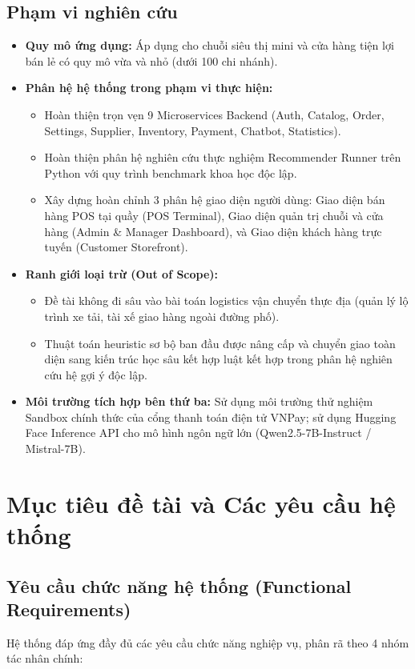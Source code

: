 \documentclass[12pt,a4paper]{report}
\begin{document}
\subsection{Phạm vi nghiên cứu}
\begin{itemize}
    \item \textbf{Quy mô ứng dụng:} Áp dụng cho chuỗi siêu thị mini và cửa hàng tiện lợi bán lẻ có quy mô vừa và nhỏ (dưới 100 chi nhánh).
    \item \textbf{Phân hệ hệ thống trong phạm vi thực hiện:}
    \begin{itemize}
        \item Hoàn thiện trọn vẹn 9 Microservices Backend (Auth, Catalog, Order, Settings, Supplier, Inventory, Payment, Chatbot, Statistics).
        \item Hoàn thiện phân hệ nghiên cứu thực nghiệm Recommender Runner trên Python với quy trình benchmark khoa học độc lập.
        \item Xây dựng hoàn chỉnh 3 phân hệ giao diện người dùng: Giao diện bán hàng POS tại quầy (POS Terminal), Giao diện quản trị chuỗi và cửa hàng (Admin \& Manager Dashboard), và Giao diện khách hàng trực tuyến (Customer Storefront).
    \end{itemize}
    \item \textbf{Ranh giới loại trừ (Out of Scope):}
    \begin{itemize}
        \item Đề tài không đi sâu vào bài toán logistics vận chuyển thực địa (quản lý lộ trình xe tải, tài xế giao hàng ngoài đường phố).
        \item Thuật toán heuristic sơ bộ ban đầu được nâng cấp và chuyển giao toàn diện sang kiến trúc học sâu kết hợp luật kết hợp trong phân hệ nghiên cứu hệ gợi ý độc lập.
    \end{itemize}
    \item \textbf{Môi trường tích hợp bên thứ ba:} Sử dụng môi trường thử nghiệm Sandbox chính thức của cổng thanh toán điện tử VNPay; sử dụng Hugging Face Inference API cho mô hình ngôn ngữ lớn (Qwen2.5-7B-Instruct / Mistral-7B).
\end{itemize}

\section{Mục tiêu đề tài và Các yêu cầu hệ thống}

\subsection{Yêu cầu chức năng hệ thống (Functional Requirements)}
Hệ thống đáp ứng đầy đủ các yêu cầu chức năng nghiệp vụ, phân rã theo 4 nhóm tác nhân chính:
\end{document}
